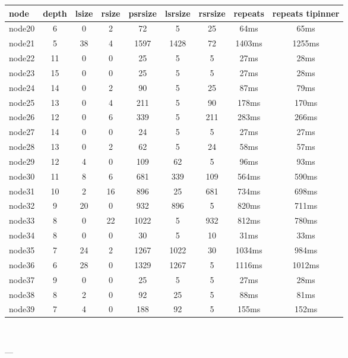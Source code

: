 \begin{tabular}{|l|c|c|c|c|c|c|c|c|}
\hline node & depth & lsize & rsize & psrsize & lsrsize & rsrsize   & repeats & repeats tipinner\\
    \hline node20 & 6 & 0 & 2 & 72 & 5 & 25 & 64ms & 65ms\\
    \hline node21 & 5 & 38 & 4 & 1597 & 1428 & 72 & 1403ms & 1255ms\\
    \hline node22 & 11 & 0 & 0 & 25 & 5 & 5 & 27ms & 28ms\\
    \hline node23 & 15 & 0 & 0 & 25 & 5 & 5 & 27ms & 28ms\\
    \hline node24 & 14 & 0 & 2 & 90 & 5 & 25 & 87ms & 79ms\\
    \hline node25 & 13 & 0 & 4 & 211 & 5 & 90 & 178ms & 170ms\\
    \hline node26 & 12 & 0 & 6 & 339 & 5 & 211 & 283ms & 266ms\\
    \hline node27 & 14 & 0 & 0 & 24 & 5 & 5 & 27ms & 27ms\\
    \hline node28 & 13 & 0 & 2 & 62 & 5 & 24 & 58ms & 57ms\\
    \hline node29 & 12 & 4 & 0 & 109 & 62 & 5 & 96ms & 93ms\\
    \hline node30 & 11 & 8 & 6 & 681 & 339 & 109 & 564ms & 590ms\\
    \hline node31 & 10 & 2 & 16 & 896 & 25 & 681 & 734ms & 698ms\\
    \hline node32 & 9 & 20 & 0 & 932 & 896 & 5 & 820ms & 711ms\\
    \hline node33 & 8 & 0 & 22 & 1022 & 5 & 932 & 812ms & 780ms\\
    \hline node34 & 8 & 0 & 0 & 30 & 5 & 10 & 31ms & 33ms\\
    \hline node35 & 7 & 24 & 2 & 1267 & 1022 & 30 & 1034ms & 984ms\\
    \hline node36 & 6 & 28 & 0 & 1329 & 1267 & 5 & 1116ms & 1012ms\\
    \hline node37 & 9 & 0 & 0 & 25 & 5 & 5 & 27ms & 28ms\\
    \hline node38 & 8 & 2 & 0 & 92 & 25 & 5 & 88ms & 81ms\\
    \hline node39 & 7 & 4 & 0 & 188 & 92 & 5 & 155ms & 152ms\\

\hline
\end{tabular} \

---


